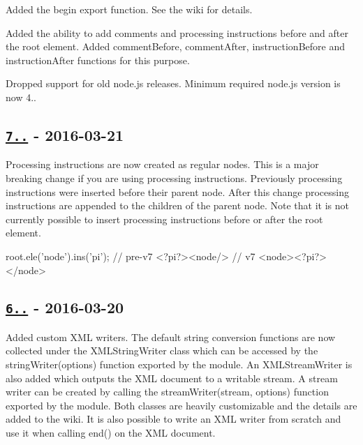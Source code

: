 \begin{DoxyItemize}
\item Added the {\ttfamily begin} export function. See the wiki for details.
\item Added the ability to add comments and processing instructions before and after the root element. Added {\ttfamily comment\+Before}, {\ttfamily comment\+After}, {\ttfamily instruction\+Before} and {\ttfamily instruction\+After} functions for this purpose.
\item Dropped support for old node.\+js releases. Minimum required node.\+js version is now 4..
\end{DoxyItemize}

\subsection*{\href{https://github.com/oozcitak/xmlbuilder-js/compare/v6.0.0...v7.0.0}{\tt 7..} -\/ 2016-\/03-\/21}


\begin{DoxyItemize}
\item Processing instructions are now created as regular nodes. This is a major breaking change if you are using processing instructions. Previously processing instructions were inserted before their parent node. After this change processing instructions are appended to the children of the parent node. Note that it is not currently possible to insert processing instructions before or after the root element. 
\begin{DoxyCode}
root.ele('node').ins('pi');
// pre-v7
<?pi?><node/>
// v7
<node><?pi?></node>
\end{DoxyCode}

\end{DoxyItemize}

\subsection*{\href{https://github.com/oozcitak/xmlbuilder-js/compare/v5.0.1...v6.0.0}{\tt 6..} -\/ 2016-\/03-\/20}


\begin{DoxyItemize}
\item Added custom X\+ML writers. The default string conversion functions are now collected under the {\ttfamily X\+M\+L\+String\+Writer} class which can be accessed by the {\ttfamily string\+Writer(options)} function exported by the module. An {\ttfamily X\+M\+L\+Stream\+Writer} is also added which outputs the X\+ML document to a writable stream. A stream writer can be created by calling the {\ttfamily stream\+Writer(stream, options)} function exported by the module. Both classes are heavily customizable and the details are added to the wiki. It is also possible to write an X\+ML writer from scratch and use it when calling {\ttfamily end()} on the X\+ML document.
\end{DoxyItemize}

